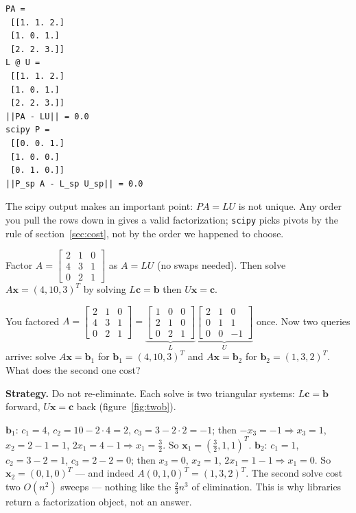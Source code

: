 \begin{lstlisting}[caption={Output of listing~\ref{lst:lu}. Our hand factorization is exact; scipy chooses different pivots — a different, equally valid $PA=LU$.}]
PA =
 [[1. 1. 2.]
 [1. 0. 1.]
 [2. 2. 3.]]
L @ U =
 [[1. 1. 2.]
 [1. 0. 1.]
 [2. 2. 3.]]
||PA - LU|| = 0.0
scipy P =
 [[0. 0. 1.]
 [1. 0. 0.]
 [0. 1. 0.]]
||P_sp A - L_sp U_sp|| = 0.0
\end{lstlisting}

\begin{remark}
The scipy output makes an important point: $PA=LU$ is not unique. Any order you pull the rows down in gives a valid factorization; \texttt{scipy} picks pivots by the rule of section~\ref{sec:cost}, not by the order we happened to choose.
\end{remark}

\begin{exercise}[medium]
Factor $A=\begin{bmatrix} 2 & 1 & 0\\ 4 & 3 & 1\\ 0 & 2 & 1\end{bmatrix}$ as $A=LU$ (no swaps needed). Then solve $A\mathbf{x}=(4,10,3)^{T}$ by solving $L\mathbf{c}=\mathbf{b}$ then $U\mathbf{x}=\mathbf{c}$.
\end{exercise}

\begin{example}\label{ex:twob}
You factored
\(
  A=\begin{bmatrix} 2 & 1 & 0\\ 4 & 3 & 1\\ 0 & 2 & 1\end{bmatrix}
  =\underbrace{\begin{bmatrix} 1 & 0 & 0\\ 2 & 1 & 0\\ 0 & 2 & 1\end{bmatrix}}_L
   \underbrace{\begin{bmatrix} 2 & 1 & 0\\ 0 & 1 & 1\\ 0 & 0 & -1\end{bmatrix}}_U
\)
once. Now two queries arrive: solve $A\mathbf{x}=\mathbf{b}_1$ for
$\mathbf{b}_1=(4,10,3)^{T}$ and $A\mathbf{x}=\mathbf{b}_2$ for
$\mathbf{b}_2=(1,3,2)^{T}$. What does the second one cost?
\par\smallskip
\textbf{Strategy.} Do not re-eliminate. Each solve is two triangular
systems: $L\mathbf{c}=\mathbf{b}$ forward, $U\mathbf{x}=\mathbf{c}$
back (figure~\ref{fig:twob}).
\begin{solution}
$\mathbf{b}_1$: $c_1=4$, $c_2=10-2\cdot4=2$, $c_3=3-2\cdot2=-1$; then
$-x_3=-1\Rightarrow x_3=1$, $x_2=2-1=1$, $2x_1=4-1\Rightarrow x_1=\tfrac32$.
So $\mathbf{x}_1=(\tfrac32,1,1)^{T}$.
$\mathbf{b}_2$: $c_1=1$, $c_2=3-2=1$, $c_3=2-2=0$; then $x_3=0$,
$x_2=1$, $2x_1=1-1\Rightarrow x_1=0$. So $\mathbf{x}_2=(0,1,0)^{T}$ ---
and indeed $A(0,1,0)^{T}=(1,3,2)^{T}$. \checkmark
The second solve cost two $O(n^2)$ sweeps --- nothing like the
$\tfrac23 n^3$ of elimination. This is why libraries return a
factorization object, not an answer.
\end{solution}
\end{example}

